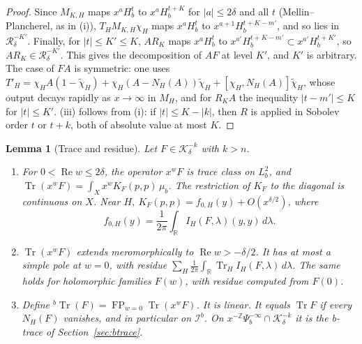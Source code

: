 \documentclass[11pt,oneside,reqno]{article}
\newcommand{\Z}{\mathbb Z}
\DeclareMathOperator{\Tr}{Tr}
\newcommand{\Ib}{\mathcal I^b}
\theoremstyle{plain}
\newtheorem{lemma}[theorem]{Lemma}
\theoremstyle{definition}
\theoremstyle{remark}
\begin{document}
\begin{proof}
Since \(M_{K,H}\) maps \(x^aH^t_b\) to \(x^aH^{t+K}_b\) for
\(|a|\leq2\delta\) and all \(t\) (Mellin--Plancherel, as in (i)),
\(T_HM_{K,H}\chi_H\) maps
\(x^aH^t_b\) to \(x^{a+1}H^{t+K-m'}_b\), and so lies in
\(\mathcal R^{-K'}_\delta\). Finally, for \(|t|\leq K'\leq K\),
\(AR_K\) maps \(x^aH^t_b\) to \(x^{a'}H^{t+K-m'}_b\subset
x^{a'}H^{t+K'}_b\), so \(AR_K\in\mathcal R^{-K'}_\delta\). This gives the
decomposition of \(AF\) at level \(K'\), and \(K'\) is arbitrary. The case
of \(FA\) is symmetric: one uses
\(T'_H=\chi_HA(1-\tilde\chi_H)+\chi_H(A-N_H(A))\tilde\chi_H
+[\chi_H,N_H(A)]\tilde\chi_H\), whose output decays rapidly as
\(x\to\infty\) in \(M_H\), and for \(R_KA\) the inequality
\(|t-m'|\leq K\) for \(|t|\leq K'\). (iii) follows from (i): if \(|t|\leq
K-|k|\), then \(R\) is applied in Sobolev order \(t\) or \(t+k\), both of
absolute value at most \(K\).
\end{proof}

\begin{lemma}[Trace and residue]\label{lem:Ktrace}
Let \(F\in\mathcal K^{-k}_\delta\) with \(k>n\).
\begin{enumerate}
\item[(i)] For \(0<\operatorname{Re}w\leq2\delta\), the operator \(x^wF\) is
trace class on \(L^2_b\), and \(\Tr(x^wF)=\int_Xx^wK_F(p,p)\,\mu_b\). The
restriction of \(K_F\) to the diagonal is continuous on \(X\). Near \(H\),
\(K_F(p,p)=f_{0,H}(y)+O(x^{\delta/2})\), where
\[
 f_{0,H}(y)=\frac1{2\pi}\int_{\mathbb R}I_H(F,\lambda)(y,y)\,d\lambda .
\]
\item[(ii)] \(\Tr(x^wF)\) extends meromorphically to
\(\operatorname{Re}w>-\delta/2\). It has at most a simple pole at \(w=0\),
with residue
\(\sum_H\frac1{2\pi}\int_{\mathbb R}\Tr_HI_H(F,\lambda)\,d\lambda\). The
same holds for holomorphic families \(F(w)\), with residue computed from
\(F(0)\).
\item[(iii)] Define \({}^b\Tr(F)=\operatorname{FP}_{w=0}\Tr(x^wF)\). It is
linear. It equals \(\Tr F\) if every \(N_H(F)\) vanishes, and in particular
on \(\Ib\). On \(x^{-\Z}\Psi_b^{-\infty}\cap\mathcal K^{-k}_\delta\) it is the
b-trace of Section~\ref{sec:btrace}.
\end{enumerate}
\end{lemma}
\end{document}
